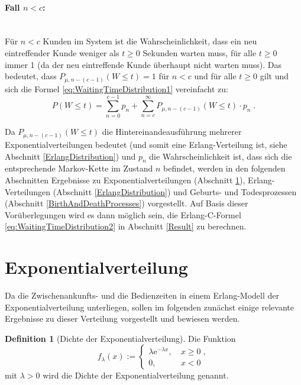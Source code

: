 \documentclass[a4paper,11pt,oneside]{article}
\theoremstyle{definition}
\newtheorem{definition}{Definition}
\begin{document}
\paragraph{Fall $n<c$:}~\\
Für $n<c$ Kunden im System ist die Wahrscheinlichkeit, dass ein neu eintreffender Kunde weniger als $t\ge0$ Sekunden warten muss, für alle $t\ge0$ immer 1 (da der neu eintreffende Kunde überhaupt nicht warten muss). Das bedeutet, dass $P_{\mu,n-(c-1)}(W\le t)=1$ für $n<c$ und für alle $t\ge0$ gilt und sich die Formel \eqref{eq:WaitingTimeDistribution1} vereinfacht zu:
\begin{equation}\label{eq:WaitingTimeDistribution2}
P(W\le t)=\sum_{n=0}^{c-1} p_n+\sum_{n=c}^\infty P_{\mu,n-(c-1)}(W\le t)\cdot p_n\;.
\end{equation}

Da $P_{\mu,n-(c-1)}(W\le t)$ die Hintereinandeausführung mehrerer Exponentialverteilungen bedeutet (und somit eine Erlang-Verteilung ist, siehe Abschnitt \ref{ErlangDistribution}) und $p_n$ die Wahrscheinlichkeit ist, dass sich die entsprechende Markov-Kette im Zustand $n$ befindet, werden in den folgenden Abschnitten Ergebnisse zu Exponentialverteilungen (Abschnitt \ref{ExponentialDistribution}), Erlang-Verteilungen (Abschnitt \ref{ErlangDistribution}) und Geburts- und Todesprozessen (Abschnitt \ref{BirthAndDeathProcesses}) vorgestellt. Auf Basis dieser Vorüberlegungen wird es dann möglich sein, die Erlang-C-Formel \eqref{eq:WaitingTimeDistribution2} in Abschnitt \ref{Result} zu berechnen.



\section{Exponentialverteilung}\label{ExponentialDistribution}

Da die Zwischenankunfts- und die Bedienzeiten in einem Erlang-Modell der Exponentialverteilung unterliegen, sollen im folgenden zunächst einige relevante Ergebnisse zu dieser Verteilung vorgestellt und bewiesen werden.

\begin{definition}[Dichte der Exponentialverteilung]
Die Funktion
$$
f_{\lambda}(x):=\left\{\begin{matrix}
\lambda \mathrm{e}^{-\lambda x},&~x\ge0\;,\\
0,&~x<0
\end{matrix}\right.
$$
mit $\lambda>0$ wird die Dichte der Exponentialverteilung genannt.
\end{definition}
\end{document}
